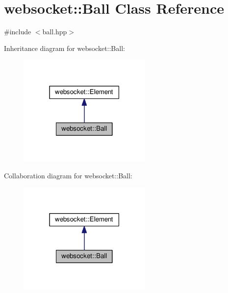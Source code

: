 \hypertarget{classwebsocket_1_1Ball}{}\section{websocket\+:\+:Ball Class Reference}
\label{classwebsocket_1_1Ball}


{\ttfamily \#include $<$ball.\+hpp$>$}



Inheritance diagram for websocket\+:\+:Ball\+:\nopagebreak
\begin{figure}[H]
\begin{center}
\leavevmode
\includegraphics[width=186pt]{classwebsocket_1_1Ball__inherit__graph}
\end{center}
\end{figure}


Collaboration diagram for websocket\+:\+:Ball\+:\nopagebreak
\begin{figure}[H]
\begin{center}
\leavevmode
\includegraphics[width=186pt]{classwebsocket_1_1Ball__coll__graph}
\end{center}
\end{figure}

